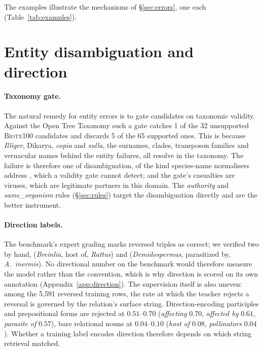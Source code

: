 \documentclass[11pt]{article}
\begin{document}
The examples illustrate the mechanisms of \S\ref{sec:errors}, one each (Table~\ref{tab:examples}).

\section{Entity disambiguation and direction}
\label{sec:notfixed}

\paragraph{Taxonomy gate.}
The natural remedy for entity errors is to gate candidates on taxonomic validity. Against the Open
Tree Taxonomy \citep{rees2017opentree} such a gate catches 1 of the 32 unsupported \textsc{Biotx100}
candidates and discards 5 of the 65 supported ones. This is because \emph{Illiger},
Dikarya, \emph{copia} and \emph{sulla}, the surnames, clades, transposon families and vernacular
names behind the entity failures, all resolve in the taxonomy. The failure is therefore one of disambiguation, of the kind species-name normalisers address \citep{gerner2010linnaeus}, which a validity gate cannot detect; and the gate's casualties are viruses, which are legitimate partners in this domain. The
\emph{authority} and \emph{same\_organism} rules (\S\ref{sec:rules}) target the disambiguation
directly and are the better instrument.

\paragraph{Direction labels.}
The benchmark's expert grading marks reversed triples as correct; we verified two by hand,
(\emph{Breinlia}, host of, \emph{Rattus}) and (\emph{Demidospermus}, parasitized by,
\emph{A.\ inermis}). No directional number on the benchmark would therefore measure the model rather
than the convention, which is why direction is scored on its own annotation
(Appendix~\ref{app:direction}). The supervision itself is also uneven: among the
5{,}591 reversed training rows, the rate at which the teacher rejects a reversal is governed by the
relation's surface string. Direction-encoding participles and prepositional forms are
rejected at $0.51$--$0.70$ (\emph{affecting} $0.70$, \emph{affected by} $0.61$, \emph{parasite of}
$0.57$), bare relational nouns at $0.04$--$0.10$ (\emph{host of} $0.08$, \emph{pollinators}
$0.04$). Whether a training label encodes direction therefore depends on which string retrieval matched.
\end{document}
